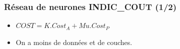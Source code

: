 \documentclass[hyperref={bookmarks=false},aspectratio=169]{beamer}
\begin{document}
\begin{frame}
 \addtocounter{framenumber}{-1}
\frametitle{Réseau de neurones INDIC\_COUT (1/2) }
\begin{itemize}
	\item $COST = K.Cost_A + Mu.Cost_P$ 
 \item On a moins de données et de couches.
\end{itemize}
	





\end{frame}
\end{document}
